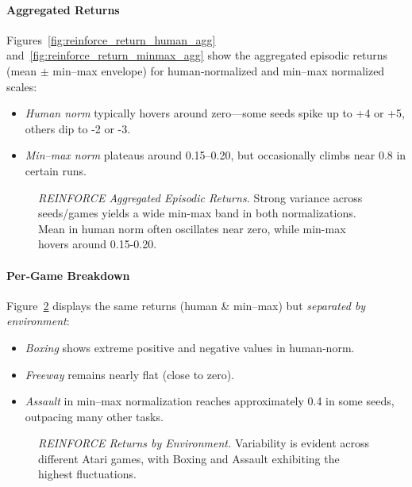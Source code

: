 \paragraph{Aggregated Returns}
Figures~\ref{fig:reinforce_return_human_agg} and~\ref{fig:reinforce_return_minmax_agg} show the aggregated episodic returns (mean $\pm$ min–max envelope) 
for human‐normalized and min--max normalized scales:
\begin{itemize}
	\item \emph{Human norm} typically hovers around zero—some seeds spike up to +4 or +5, others dip to -2 or -3.
	\item \emph{Min--max norm} plateaus around 0.15--0.20, but occasionally climbs near 0.8 in certain runs.
\end{itemize}

\begin{figure}
	\centering
	\quad
	\caption{\textit{REINFORCE Aggregated Episodic Returns.} 
		Strong variance across seeds/games yields a wide min-max band in both normalizations. 
		Mean in human norm often oscillates near zero, while min-max hovers around 0.15-0.20.}
	\label{fig:reinforce_returns_agg}
\end{figure}

\paragraph{Per‐Game Breakdown}
Figure~\ref{fig:reinforce_pergame_return} displays the same returns (human \& min--max) 
but \emph{separated by environment}:
\begin{itemize}
	\item \emph{Boxing} shows extreme positive and negative values in human‐norm.
	\item \emph{Freeway} remains nearly flat (close to zero).
	\item \emph{Assault} in min--max normalization reaches approximately 0.4 in some seeds, outpacing many other tasks.
\end{itemize}

\begin{figure}
	\centering
	\quad
	\caption{\textit{REINFORCE Returns by Environment.} 
	Variability is evident across different Atari games, with Boxing and Assault exhibiting the highest fluctuations.}
	\label{fig:reinforce_pergame_return}
\end{figure}

